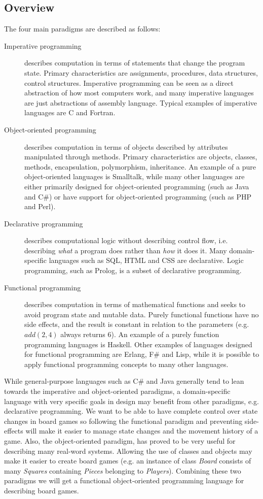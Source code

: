 \subsection{Overview}
The four main paradigms are described as follows:\cite{fourparadigms}
\begin{description}
\item[Imperative programming] describes computation in terms of statements that
  change the program state. Primary characteristics are assignments, procedures,
  data structures, control structures. Imperative programming can be seen as a
  direct abstraction of how most computers work, and many imperative languages
  are just abstractions of assembly language. Typical examples of imperative
  languages are C and Fortran.
\item[Object-oriented programming] describes computation in terms of objects
  described by attributes manipulated through methods. Primary characteristics
  are objects, classes, methods, encapsulation, polymorphism, inheritance. An
  example of a pure object-oriented languages is Smalltalk, while many other
  languages are either primarily designed for object-oriented programming (such
  as Java and C\#) or have support for object-oriented programming (such as PHP
  and Perl).
\item[Declarative programming] describes computational logic without describing
  control flow, i.e. describing {\em what} a program does rather than {\em how}
  it does it. Many domain-specific languages such as SQL, HTML and CSS are
  declarative. Logic programming, such as Prolog, is a subset of declarative
  programming.
\item[Functional programming] describes computation in terms of mathematical
  functions and seeks to avoid program state and mutable data. Purely functional
  functions have no side effects, and the result is constant in relation to the
  parameters (e.g. $add(2, 4)$ always returns $6$). An example of a purely
  function programming languages is Haskell. Other examples of languages
  designed for functional programming are Erlang, F\# and Lisp, while it is
  possible to apply functional programming concepts to many other languages.
\end{description}


While general-purpose languages such as C\# and Java generally tend to lean
towards the imperative and object-oriented paradigms, a domain-specific
language with very specific goals in design may benefit from other paradigms,
e.g. declarative programming. We want to be able to have complete control
over state changes in board games so following the functional paradigm
and preventing side-effects will make it easier to manage state changes
and the movement history of a game. Also, the object-oriented paradigm,
has proved to be very useful for describing many real-word systems. Allowing
the use of classes and objects may make it easier to create board games
(e.g. an instance of class \emph{Board} consists of many \emph{Squares} 
containing \emph{Pieces} belonging to \emph{Players}). Combining these two
paradigms we will get a functional object-oriented programming language
for describing board games.

